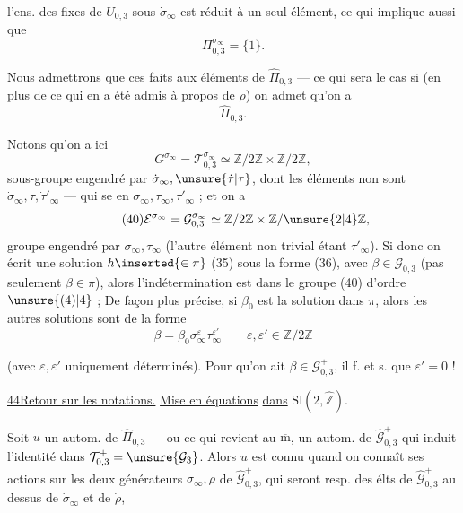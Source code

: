 
l'ens. des  fixes de $U_{0,3}$ sous $\dot{\sigma}_\infty$ est réduit à un seul élément, ce qui implique aussi que
\[
\Pi_{0,3}^{\sigma_\infty}=\{1\}.
\]

Nous admettrons  que ces faits  aux éléments de $\widehat{\Pi}_{0,3}$ --- ce qui sera le cas si (en plus de ce qui en a été admis à propos de $\rho$) on admet qu'on a 
\[
\tag{38}
\widehat{\Pi}_{0,3}.
\]

Notons qu'on a ici
\[
\tag{39}
G^{\sigma_\infty}=\mathcal T_{0,3}^{\sigma_\infty}\simeq\mathbb Z/2\mathbb Z\times\mathbb Z/2\mathbb Z,
\]
sous-groupe engendré par $\dot{\sigma}_\infty,\unsure{\dot\tau|\tau}$, dont les éléments non  sont $\dot{\sigma}_\infty,\tau,\dot{\tau}'_\infty$ --- qui se  en $\sigma_\infty,\tau_\infty,\tau'_\infty$ ; et on a
\[
\tag{40}
\mathcal E^{\sigma_\infty}=\mathcal G_{0,3}^{\sigma_\infty}\simeq\mathbb Z/2\mathbb Z\times\mathbb Z/\unsure{2|4}\mathbb Z,
\]
groupe engendré par $\sigma_\infty,\tau_\infty$ (l'autre élément non trivial étant $\tau'_\infty$). Si donc on écrit une solution $h\inserted{\in\pi}$  (35) sous la forme (36), avec $\beta\in\mathcal G_{0,3}$  (pas seulement $\beta\in\pi$), alors l'indétermination est dans le groupe (40) d'ordre $\unsure{(4)|4}$ ; De façon plus précise, si $\beta_0$ est la solution dans $\pi$, alors les autres solutions sont de la forme
\[
\tag{41}
\beta=\beta_0\sigma_\infty^\varepsilon\tau_\infty^{\varepsilon'}
\qquad \varepsilon,\varepsilon'\in\mathbb Z/2\mathbb Z
\]



(avec $\varepsilon,\varepsilon'$ uniquement déterminés). Pour qu'on ait $\beta\in\mathcal G_{0,3}^{+}$, il f. et s. que $\varepsilon'=0$ !




\uline{44}\qquad \uline{Retour sur les notations.} \uline{Mise en équations} \uline{dans} $\mathrm{Sl}(2,\widehat{\mathbb Z})$.

Soit $u$ un autom. de $\widehat{\Pi}_{0,3}$  --- ou ce qui revient au $\overline{\mathrm m}$, un autom. de $\widehat{\mathcal G}_{0,3}^{+}$ qui induit l'identité dans $\mathcal T_{0,3}^{+}=\unsure{\mathcal G_3}$. Alors $u$ est connu quand on connaît ses actions sur les deux générateurs $\sigma_\infty,\rho$ de $\widehat{\mathcal G}_{0,3}^{+}$, qui seront resp. des élts de $\widehat{\mathcal G}_{0,3}^{+}$ au dessus de $\dot{\sigma}_\infty$ et de $\dot\rho$,

